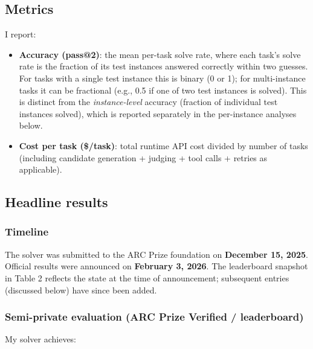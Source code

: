 \documentclass[11pt]{article}
\providecommand{\tightlist}{%
  \setlength{\itemsep}{0pt}\setlength{\parskip}{0pt}}
\begin{document}
\hypertarget{metrics}{%
\subsection{Metrics}\label{metrics}}

I report:

\begin{itemize}
\tightlist
\item
  \textbf{Accuracy (pass@2)}: the mean per-task solve rate, where each
  task's solve rate is the fraction of its test instances answered
  correctly within two guesses. For tasks with a single test instance
  this is binary (0 or 1); for multi-instance tasks it can be fractional
  (e.g., 0.5 if one of two test instances is solved). This is distinct
  from the \emph{instance-level} accuracy (fraction of individual test
  instances solved), which is reported separately in the per-instance
  analyses below.
\item
  \textbf{Cost per task (\$/task)}: total runtime API cost divided by
  number of tasks (including candidate generation + judging + tool calls
  + retries as applicable).
\end{itemize}

\hypertarget{headline-results}{%
\subsection{Headline results}\label{headline-results}}

\hypertarget{timeline}{%
\subsubsection{Timeline}\label{timeline}}

The solver was submitted to the ARC Prize foundation on \textbf{December
15, 2025}. Official results were announced on \textbf{February 3, 2026}.
The leaderboard snapshot in Table 2 reflects the state at the time of
announcement; subsequent entries (discussed below) have since been
added.

\hypertarget{semi-private-evaluation-arc-prize-verified-leaderboard}{%
\subsubsection{Semi-private evaluation (ARC Prize Verified /
leaderboard)}\label{semi-private-evaluation-arc-prize-verified-leaderboard}}

My solver achieves:
\end{document}
